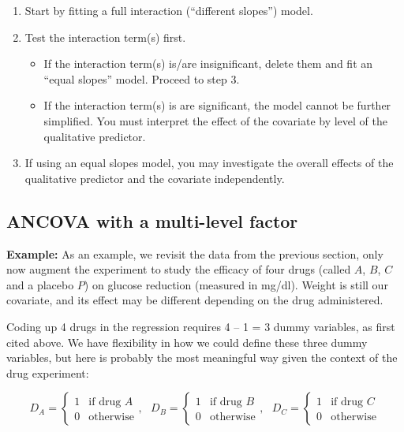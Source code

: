 \documentclass[
]{book}
\providecommand{\tightlist}{%
  \setlength{\itemsep}{0pt}\setlength{\parskip}{0pt}}
\begin{document}
\begin{enumerate}
\def\labelenumi{\arabic{enumi}.}
\tightlist
\item
  Start by fitting a full interaction (``different slopes'') model.
\item
  Test the interaction term(s) first.

  \begin{itemize}
  \tightlist
  \item
    If the interaction term(s) is/are insignificant, delete them and fit an ``equal slopes'' model. Proceed to step 3.
  \item
    If the interaction term(s) is are significant, the model cannot be further simplified. You must interpret the effect of the covariate by level of the qualitative predictor.
  \end{itemize}
\item
  If using an equal slopes model, you may investigate the overall effects of the qualitative predictor and the covariate independently.
\end{enumerate}

\hypertarget{ancova-with-a-multi-level-factor}{%
\subsection{ANCOVA with a multi-level factor}\label{ancova-with-a-multi-level-factor}}

\textbf{Example:} As an example, we revisit the data from the previous section, only now augment the experiment to study the efficacy of four drugs (called \(A\), \(B\), \(C\) and a placebo \(P\)) on glucose reduction (measured in mg/dl). Weight is still our covariate, and its effect may be different depending on the drug administered.

Coding up 4 drugs in the regression requires 4 -- 1 = 3 dummy variables, as first cited above. We have flexibility in how we could define these three dummy variables, but here is probably the most meaningful way given the context of the drug experiment:

\[D_A = \left\{\begin{array}{ll} 1 & \textrm{if drug } A \\ 0 & \textrm{otherwise}\end{array}\right., ~~~ D_B = \left\{\begin{array}{ll} 1 & \textrm{if drug } B \\ 0 & \textrm{otherwise}\end{array}\right.,~~~ D_C = \left\{\begin{array}{ll} 1 & \textrm{if drug } C \\ 0 & \textrm{otherwise}\end{array}\right.\]
\end{document}
